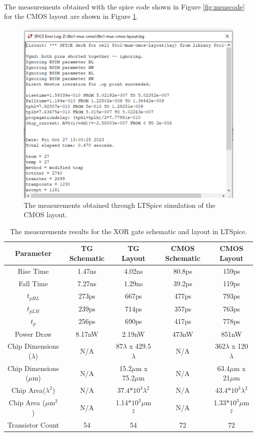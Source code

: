 \documentclass{article}
\begin{document}
    \paragraph{}
    The measurements obtained with the spice code shown in Figure \ref{fig:meascode} for the CMOS layout are shown in Figure \ref{fig:cmoslaymeas}.

    \begin{figure}[H]
      \centering
      \includegraphics[width=0.5\linewidth, frame]{screenshots/cmos/lay/meas.png}
      \caption{The measurements obtained through LTSpice simulation of the CMOS layout.}
      \label{fig:cmoslaymeas}
    \end{figure}






  \begin{table}[H]
    \centering
    \footnotesize
    \begin{tabular}{|c|c|c|c|c|}
      \hline
      \textbf{Parameter} & \textbf{TG Schematic} & \textbf{TG Layout} & \textbf{CMOS Schematic} & \textbf{CMOS Layout} \\
      \hline
      Rise Time & 1.47ns & 4.02ns & 80.8ps & 159ps \\
      \hline
      Fall Time & 7.27ns & 1.29ns & 39.2ps & 119ps\\
      \hline
      $t_{pHL}$ & 273ps & 667ps & 477ps & 793ps\\
      \hline
      $t_{pLH}$ & 239ps & 714ps & 357ps & 763ps\\
      \hline
      $t_{p}$ & 256ps & 690ps & 417ps & 778ps\\
      \hline
      Power Draw & 8.17nW & 2.19nW & 473nW & 851nW \\
      \hline
      Chip Dimensions ($\lambda$) & N/A & 87$\lambda$ x 429.5$\lambda$ & N/A & 362$\lambda$ x 120$\lambda$ \\
      \hline
      Chip Dimensions ($\mu$m) & N/A & 15.2$\mu$m x 75.2$\mu$m & N/A & 63.4$\mu$m x 21$\mu$m \\
      \hline
      Chip Area($\lambda^2$) & N/A & 37.4$*10^3\lambda^2$ & N/A & 43.4$*10^3\lambda^2$ \\
      \hline
      Chip Area ($\mu$m$^2$) & N/A & 1.14$*10^3\mu$m$^2$ & N/A & 1.33$*10^3\mu$m$^2$ \\
      \hline
      Transistor Count & 54 & 54 & 72 & 72 \\
      \hline
    \end{tabular}
    \caption{The measurements results for the XOR gate schematic and layout in LTSpice.}
    \label{table:meas-lay}
  \end{table}
\end{document}
